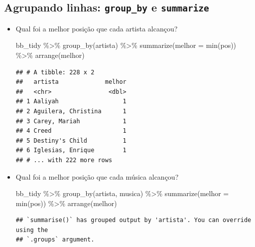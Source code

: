\documentclass[
  11pt]{report}
\newenvironment{Shaded}{\begin{snugshade}}{\end{snugshade}}
\newcommand{\AttributeTok}[1]{\textcolor[rgb]{0.77,0.63,0.00}{#1}}
\newcommand{\FunctionTok}[1]{\textcolor[rgb]{0.00,0.00,0.00}{#1}}
\newcommand{\NormalTok}[1]{#1}
\newcommand{\SpecialCharTok}[1]{\textcolor[rgb]{0.00,0.00,0.00}{#1}}
\renewenvironment{Shaded}{
    \begin{mdframed}[%
      roundcorner=2pt,%
      innerleftmargin=5pt,%
      innerrightmargin=5pt,%
      topline=true,%
      leftline=true,%
      rightline=true,%
      bottomline=true,%
      linewidth=0.5pt,%
      linecolor=black!20,%
      backgroundcolor=black!2,%
      skipabove=2ex,%
      skipbelow=2.5ex%
    ]%
  }
  {
    \end{mdframed}
  }
\begin{document}
\hypertarget{agrupando-linhas-group_by-e-summarize}{%
\subsection{\texorpdfstring{Agrupando linhas: \texttt{group\_by} e \texttt{summarize}}{Agrupando linhas: group\_by e summarize}}\label{agrupando-linhas-group_by-e-summarize}}

\begin{itemize}
\item
  Qual foi a melhor posição que cada artista alcançou?

\begin{Shaded}
\begin{Highlighting}[]
\NormalTok{bb\_tidy }\SpecialCharTok{\%\textgreater{}\%} 
  \FunctionTok{group\_by}\NormalTok{(artista) }\SpecialCharTok{\%\textgreater{}\%} 
  \FunctionTok{summarize}\NormalTok{(}\AttributeTok{melhor =} \FunctionTok{min}\NormalTok{(pos)) }\SpecialCharTok{\%\textgreater{}\%} 
  \FunctionTok{arrange}\NormalTok{(melhor)}
\end{Highlighting}
\end{Shaded}

\begin{verbatim}
## # A tibble: 228 x 2
##   artista             melhor
##   <chr>                <dbl>
## 1 Aaliyah                  1
## 2 Aguilera, Christina      1
## 3 Carey, Mariah            1
## 4 Creed                    1
## 5 Destiny's Child          1
## 6 Iglesias, Enrique        1
## # ... with 222 more rows
\end{verbatim}
\item
  Qual foi a melhor posição que cada música alcançou?

\begin{Shaded}
\begin{Highlighting}[]
\NormalTok{bb\_tidy }\SpecialCharTok{\%\textgreater{}\%} 
  \FunctionTok{group\_by}\NormalTok{(artista, musica) }\SpecialCharTok{\%\textgreater{}\%} 
  \FunctionTok{summarize}\NormalTok{(}\AttributeTok{melhor =} \FunctionTok{min}\NormalTok{(pos)) }\SpecialCharTok{\%\textgreater{}\%} 
  \FunctionTok{arrange}\NormalTok{(melhor)}
\end{Highlighting}
\end{Shaded}

\begin{verbatim}
## `summarise()` has grouped output by 'artista'. You can override using the
## `.groups` argument.
\end{verbatim}


\end{itemize}
\end{document}
